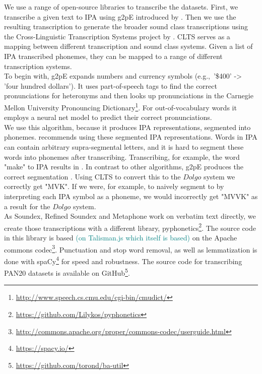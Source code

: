 We use a range of open-source libraries to transcribe the datasets.
First, we transcribe a given text to IPA using g2pE introduced by \cite{kyubyong2019g2pE}.
Then we use the resulting transcription to generate the broader sound class transcriptions using the Cross-Linguistic Transcription Systems project by \cite{list2018cltsIntro}.
CLTS serves as a mapping between different transcription and sound class systems.
Given a list of IPA transcribed phonemes, they can be mapped to a range of different transcription systems.\\
To begin with, g2pE expands numbers and currency symbols (e.g.,\ '\$400' -> 'four hundred dollars').
It uses part-of-speech tags to find the correct pronunciations for heteronyms and then looks up pronunciations in the Carnegie Mellon University Pronouncing Dictionary\footnote{\url{http://www.speech.cs.cmu.edu/cgi-bin/cmudict/}}.
For out-of-vocabulary words it employs a neural net model to predict their correct pronunciations.\\
We use this algorithm, because it produces IPA representations, segmented into phonemes.
\cite{list2018sequence} recommends using these segmented IPA representations.
Words in IPA can contain arbitrary supra-segmental letters, and it is hard to segment these words into phonemes after transcribing.
Transcribing, for example, the word "make" to IPA results in \textipa{[meIk]}.
In contrast to other algorithms, g2pE produces the correct segmentation \textipa{[m eI k]}.
Using CLTS to convert this to the $Dolgo$ system we correctly get "MVK".
If we were, for example, to naively segment \textipa{[meIk]} to \textipa{[m e I k]} by interpreting each IPA symbol as a phoneme, we would incorrectly get "MVVK" as a result for the $Dolgo$ system.\\
As Soundex, Refined Soundex and Metaphone work on verbatim text directly, we create those transcriptions with a different library, pyphonetics\footnote{\url{https://github.com/Lilykos/pyphonetics}}.
The source code in this library is based \textcolor{teal}{(on Talisman.js which itself is based)} on the Apache commons codec\footnote{\url{http://commons.apache.org/proper/commons-codec/userguide.html}}.
Punctuation and stop word removal, as well as lemmatization is done with spaCy\footnote{\url{https://spacy.io/}} for speed and robustness.
The source code for transcribing PAN20 datasets is available on GitHub\footnote{\url{https://github.com/torond/ba-util}}.


